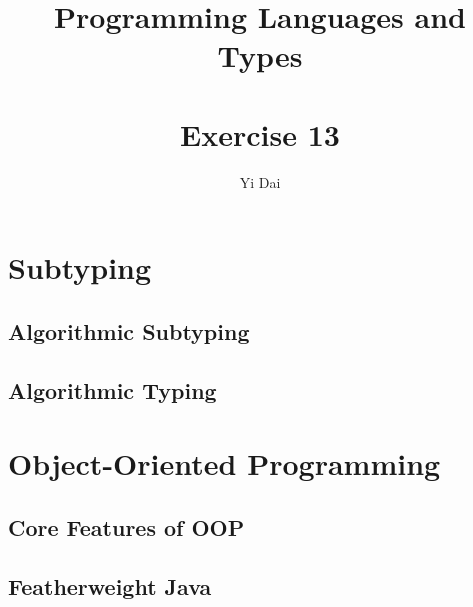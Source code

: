 \documentclass[a4paper,12pt]{article}
\title{
 Programming Languages and Types \\~\\
 \textbf{Exercise 13}
}
\author{
 Yi Dai
}
\begin{document}
\maketitle

\section{Subtyping}

\subsection{Algorithmic Subtyping}

\subsection{Algorithmic Typing}

\section{Object-Oriented Programming}

\subsection{Core Features of OOP}

\subsection{Featherweight Java}
\end{document}
